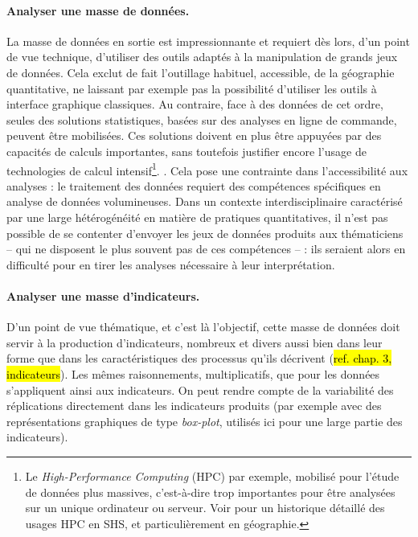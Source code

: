 \paragraph{Analyser une masse de données.}
La masse de données en sortie est impressionnante et requiert dès lors, d'un point de vue technique, d'utiliser des outils adaptés à la manipulation de grands jeux de données.
Cela exclut de fait l'outillage habituel, accessible, de la géographie quantitative, ne laissant par exemple pas la possibilité d'utiliser les outils à interface graphique classiques.
Au contraire, face à des données de cet ordre, seules des solutions statistiques, basées sur des analyses en ligne de commande, peuvent être mobilisées.
Ces solutions doivent en plus être appuyées par des capacités de calculs importantes, sans toutefois justifier encore l'usage de technologies de calcul intensif\footnote{
	Le \og \textit{High-Performance Computing}\fg{} (HPC) par exemple, mobilisé pour l'étude de données plus massives, c'est-à-dire trop importantes pour être analysées sur un unique ordinateur ou serveur.
	Voir \textcite[223--283]{rey-coyrehourcq_plateforme_2015} pour un historique détaillé des usages HPC en SHS, et particulièrement en géographie.
}. .
Cela pose une contrainte dans l'accessibilité aux analyses : le traitement des données requiert des compétences spécifiques en analyse de données volumineuses.
Dans un contexte interdisciplinaire caractérisé par une large hétérogénéité en matière de pratiques quantitatives, il n'est pas possible de se contenter d'envoyer les jeux de données produits aux thématiciens -- qui ne disposent le plus souvent pas de ces compétences -- : ils seraient alors en difficulté pour en tirer les analyses nécessaire à leur interprétation.

\paragraph{Analyser une masse d'indicateurs.}
D'un point de vue thématique, et c'est là l'objectif, cette masse de données doit servir à la production d'indicateurs, nombreux et divers aussi bien dans leur forme que dans les caractéristiques des processus qu'ils décrivent (\hl{ref. chap. 3, indicateurs}).
Les mêmes raisonnements, \og multiplicatifs\fg{}, que pour les données s'appliquent ainsi aux indicateurs.
On peut rendre compte de la variabilité des réplications directement dans les indicateurs produits (par exemple avec des représentations graphiques de type \textit{box-plot}, utilisés ici pour une large partie des indicateurs).

